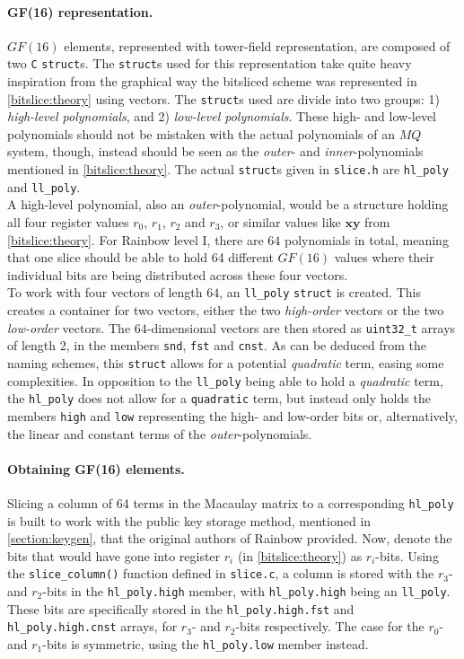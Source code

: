 \paragraph{GF(16) representation.}
$GF(16)$ elements, represented with tower-field representation, are composed of two \texttt{C} \texttt{struct}s. The \texttt{struct}s used for this representation take quite heavy inspiration from the graphical way the bitsliced scheme was represented in \cref{bitslice:theory} using vectors. The \texttt{struct}s used are divide into two groups: 1) \emph{high-level polynomials}, and 2) \emph{low-level polynomials}. These high- and low-level polynomials should not be mistaken with the actual polynomials of an $MQ$ system, though, instead should be seen as the \emph{outer}- and \emph{inner}-polynomials mentioned in \cref{bitslice:theory}. The actual \texttt{struct}s given in \texttt{slice.h} are \texttt{hl\_poly} and \texttt{ll\_poly}.
\medskip\\
A high-level polynomial, also an \emph{outer}-polynomial, would be a structure holding all four register values $r_0$, $r_1$, $r_2$ and $r_3$, or similar values like $\textbf{xy}$ from \cref{bitslice:theory}. For Rainbow level I, there are $64$ polynomials in total, meaning that one slice should be able to hold 64 different $GF(16)$ values where their individual bits are being distributed across these four vectors.
\medskip\\
To work with four vectors of length $64$, an \texttt{ll\_poly} \texttt{struct} is created. This creates a container for two vectors, either the two \emph{high-order} vectors or the two \emph{low-order} vectors. The $64$-dimensional vectors are then stored as \texttt{uint32\_t} arrays of length 2, in the members \texttt{snd}, \texttt{fst} and \texttt{cnst}. As can be deduced from the naming schemes, this \texttt{struct} allows for a potential \emph{quadratic} term, easing some complexities. In opposition to the \texttt{ll\_poly} being able to hold a \emph{quadratic} term, the \texttt{hl\_poly} does not allow for a \texttt{quadratic} term, but instead only holds the members \texttt{high} and \texttt{low} representing the high- and low-order bits or, alternatively, the linear and constant terms of the \textit{outer}-polynomials.
\paragraph{Obtaining GF(16) elements.}
Slicing a column of 64 terms in the Macaulay matrix to a corresponding \texttt{hl\_poly} is built to work with the public key storage method, mentioned in \cref{section:keygen}, that the original authors of Rainbow provided. Now, denote the bits that would have gone into register $r_i$ (in \cref{bitslice:theory}) as $r_i$-bits. Using the \texttt{slice\_column()} function defined in \texttt{slice.c}, a column is stored with the $r_3$- and $r_2$-bits in the \texttt{hl\_poly.high} member, with \texttt{hl\_poly.high} being an \texttt{ll\_poly}. These bits are specifically stored in the \texttt{hl\_poly.high.fst} and \texttt{hl\_poly.high.cnst} arrays, for $r_3$- and $r_2$-bits respectively. The case for the $r_0$- and $r_1$-bits is symmetric, using the \texttt{hl\_poly.low} member instead.
